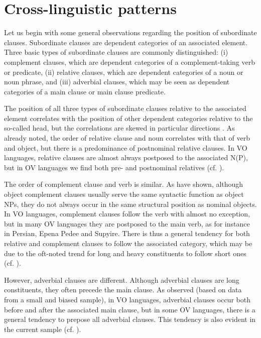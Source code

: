 \documentclass[output=paper]{langsci/langscibook}
\begin{document}
\section{Cross-linguistic patterns}

Let us begin with some general observations regarding the position of subordinate clauses. Subordinate clauses are dependent categories of an associated element. Three basic types of subordinate clauses are commonly distinguished: 
(i) complement clauses, which are dependent categories of a complement-taking verb or predicate, 
(ii) relative clauses, which are dependent categories of a noun or noun phrase, and 
(iii) adverbial clauses, which may be seen as dependent categories of a main clause or main clause predicate. 

The position of all three types of subordinate clauses relative to the associated element correlates with the position of other dependent categories relative to the so-called head, but the correlations are skewed in particular directions \citep{Diessel2001}. As \citet{Greenberg1963} already noted, the order of relative clause and noun correlates with that of verb and object, but there is a predominance of postnominal relative clauses. In VO languages, relative clauses are almost always postposed to the associated N(P), but in OV languages we find both pre- and postnominal relatives (cf. \citealt{Dryer2005_Rel}). 

The order of complement clause and verb is similar. As \citet{Schmidtke-BodeDiessel2017} have shown, although object complement clauses usually serve the same syntactic function as object NPs, they do not always occur in the same structural position as nominal objects. In VO languages, complement clauses follow the verb with almost no exception, but in many OV languages they are postposed to the main verb, as for instance in Persian, Epena Pedee and Supyire. There is thus a general tendency for both relative and complement clauses to follow the associated category, which may be due to the oft-noted trend for long and heavy constituents to follow short ones (cf. \citealt{Behaghel1932}).

However, adverbial clauses are different. Although adverbial clauses are long constituents, they often precede the main clause. As \citet{Diessel2001} observed (based on data from a small and biased sample), in VO languages, adverbial clauses occur both before and after the associated main clause, but in some OV languages, there is a general tendency to prepose all adverbial clauses. This tendency is also evident in the current sample (cf. ).
\end{document}
